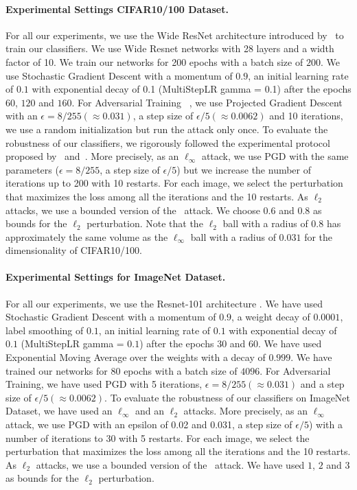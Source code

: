 \paragraph{Experimental Settings CIFAR10/100 Dataset.}
For all our experiments, we use the Wide ResNet architecture introduced by~\citet{zagoruyko2016wide} to train our classifiers.
We use Wide Resnet networks with 28 layers and a width factor of 10. We train our networks for 200 epochs with a batch size of $200$. We use Stochastic Gradient Descent with a momentum of $0.9$, an initial learning rate of $0.1$ with exponential decay of 0.1 (MultiStepLR gamma = 0.1) after the epochs $60$, $120$ and $160$.
For Adversarial Training ~\cite{madry2018towards}, we use Projected Gradient Descent with an $\epsilon = 8/255 (\approx 0.031)$, a step size of $\epsilon/5 (\approx 0.0062)$ and 10 iterations, we use a random initialization but run the attack only once.
To evaluate the robustness of our classifiers, we rigorously followed the experimental protocol proposed by~\citet{tramer2020adaptive} and~\citet{carlini2019evaluating}.
More precisely, as an $\ell_\infty$ attack, we use PGD with the same parameters ($\epsilon = 8/255$, a step size of $\epsilon/5$) but we increase the number of iterations up to 200 with 10 restarts.
For each image, we select the perturbation that maximizes the loss among all the iterations and the 10 restarts.
As $\ell_2$ attacks, we use a bounded version of the~\citet{carlini2017towards} attack.
We choose $0.6$ and $0.8$ as bounds for the $\ell_2$ perturbation.
Note that the $\ell_2$ ball with a radius of $0.8$ has approximately the same volume as the $\ell_\infty$ ball with a radius of $0.031$ for the dimensionality of CIFAR10/100.


\paragraph{Experimental Settings for ImageNet Dataset.}
For all our experiments, we use the Resnet-101 architecture \cite{he2016deep}.
We have used Stochastic Gradient Descent with a momentum of $0.9$, a weight decay of $0.0001$, label smoothing of $0.1$, an initial learning rate of $0.1$ with exponential decay of $0.1$ (MultiStepLR gamma = $0.1$) after the epochs $30$ and $60$.
We have used Exponential Moving Average over the weights with a decay of $0.999$.
We have trained our networks for 80 epochs with a batch size of $4096$.
For Adversarial Training, we have used PGD with 5 iterations, $\epsilon = 8/255 (\approx 0.031)$ and a step size of $\epsilon/5 (\approx 0.0062)$.
To evaluate the robustness of our classifiers on ImageNet Dataset, we have used an $\ell_\infty$ and an $\ell_2$ attacks.
More precisely, as an $\ell_\infty$ attack, we use PGD with an epsilon of 0.02 and 0.031, a step size of $\epsilon/5$) with a number of iterations to 30 with 5 restarts.
For each image, we select the perturbation that maximizes the loss among all the iterations and the 10 restarts.
As $\ell_2$ attacks, we use a bounded version of the~\citet{carlini2017towards} attack.
We have used $1$, $2$ and $3$ as bounds for the $\ell_2$ perturbation.


